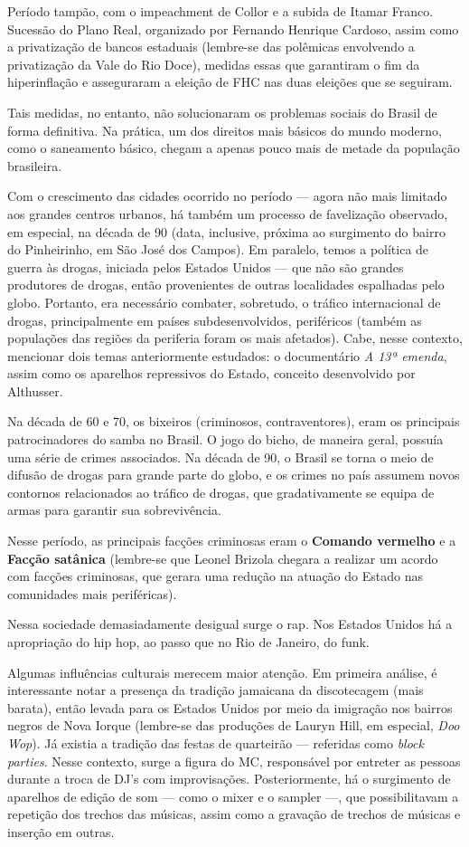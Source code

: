 Período tampão, com o impeachment de Collor e a subida de Itamar Franco. Sucessão do Plano Real, organizado por Fernando Henrique Cardoso, assim como a privatização de bancos estaduais (lembre-se das polêmicas envolvendo a privatização da Vale do Rio Doce), medidas essas que garantiram o fim da hiperinflação e asseguraram a eleição de FHC nas duas eleições que se seguiram.

Tais medidas, no entanto, não solucionaram os problemas sociais do Brasil de forma definitiva. Na prática, um dos direitos mais básicos do mundo moderno, como o saneamento básico, chegam a apenas pouco mais de metade da população brasileira.

Com o crescimento das cidades ocorrido no período — agora não mais limitado aos grandes centros urbanos, há também um processo de favelização observado, em especial, na década de 90 (data, inclusive, próxima ao surgimento do bairro do Pinheirinho, em São José dos Campos). Em paralelo, temos a política de guerra às drogas, iniciada pelos Estados Unidos — que não são grandes produtores de drogas, então provenientes de outras localidades espalhadas pelo globo. Portanto, era necessário combater, sobretudo, o tráfico internacional de drogas, principalmente  em países subdesenvolvidos, periféricos (também as populações das regiões da periferia foram os mais afetados). Cabe, nesse contexto, mencionar dois temas anteriormente estudados: o documentário \textit{A 13ª emenda}, assim como os aparelhos repressivos do Estado, conceito desenvolvido por Althusser.

Na década de 60 e 70, os bixeiros (criminosos, contraventores), eram os principais patrocinadores do samba no Brasil. O jogo do bicho, de maneira geral, possuía uma série de crimes associados. Na década de 90, o Brasil se torna o meio de difusão de drogas para grande parte do globo, e os crimes no país assumem novos contornos relacionados ao tráfico de drogas, que gradativamente se equipa de armas para garantir sua sobrevivência.

Nesse período, as principais facções criminosas eram o \textbf{Comando vermelho} e a \textbf{Facção satânica} (lembre-se que Leonel Brizola chegara a realizar um acordo com facções criminosas, que gerara uma redução na atuação do Estado nas comunidades mais periféricas).

Nessa sociedade demasiadamente desigual surge o rap. Nos Estados Unidos há a apropriação do hip hop, ao passo que no Rio de Janeiro, do funk.

Algumas influências culturais merecem maior atenção. Em primeira análise, é interessante notar a presença da tradição jamaicana da discotecagem (mais barata), então levada para os Estados Unidos por meio da imigração nos bairros negros de Nova Iorque (lembre-se das produções de Lauryn Hill, em especial, \textit{Doo Wop}). Já existia a tradição das festas de quarteirão — referidas como \textit{block parties}. Nesse contexto, surge a figura do MC, responsável por entreter as pessoas durante a troca de DJ's com improvisações. Posteriormente, há o surgimento de aparelhos de edição de som — como o mixer e o sampler —, que possibilitavam a repetição dos trechos das músicas, assim como a gravação de trechos de músicas e inserção em outras.

